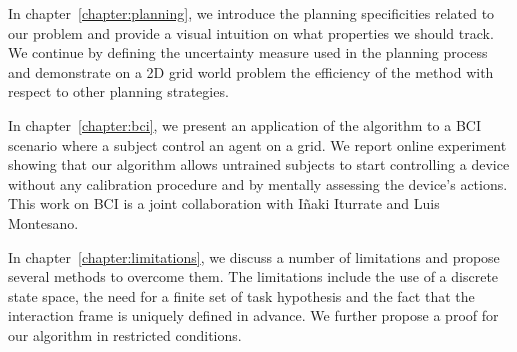 In chapter~\ref{chapter:planning}, we introduce the planning specificities related to our problem and provide a visual intuition on what properties we should track. We continue by defining the uncertainty measure used in the planning process and demonstrate on a 2D grid world problem the efficiency of the method with respect to other planning strategies.

In chapter~\ref{chapter:bci}, we present an application of the algorithm to a BCI scenario where a subject control an agent on a grid. We report online experiment showing that our algorithm allows untrained subjects to start controlling a device without any calibration procedure and by mentally assessing the device's actions. This work on BCI is a joint collaboration with I{\~n}aki Iturrate and Luis Montesano.

In chapter~\ref{chapter:limitations}, we discuss a number of limitations and propose several methods to overcome them. The limitations include the use of a discrete state space, the need for a finite set of task hypothesis and the fact that the interaction frame is uniquely defined in advance. We further propose a proof for our algorithm in restricted conditions.